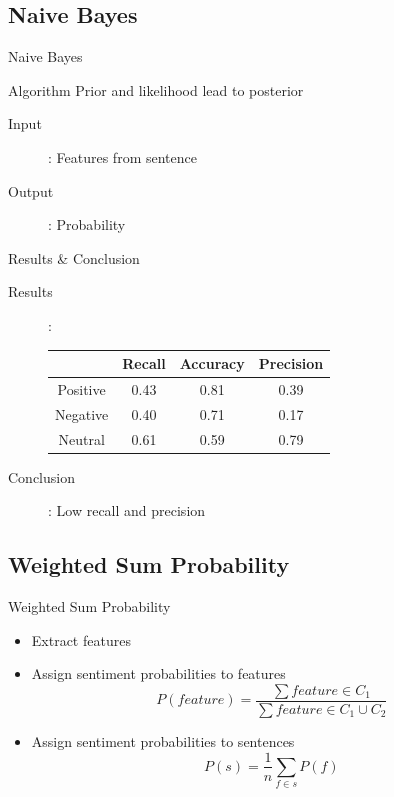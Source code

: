 \documentclass{beamer}
\begin{document}
\subsection{Naive Bayes}
\begin{frame}{Naive Bayes}
\begin{block}{Algorithm}
Prior and likelihood lead to posterior
\end{block}
\begin{description}
\item[Input]: Features from sentence
\item[Output]: Probability
\end{description}
\end{frame}
\begin{frame}{Results \& Conclusion}
\begin{description}
\item[Results]:
\begin{tabular}{c || c | c | c}\\
 & Recall & Accuracy & Precision \\
\hline
Positive & 0.43 & 0.81 & 0.39\\
Negative & 0.40 & 0.71 & 0.17 \\
Neutral & 0.61 & 0.59 & 0.79 \\
\end{tabular}
\item[Conclusion]: Low recall and precision
\end{description}
\end{frame}

\subsection{Weighted Sum Probability}
\begin{frame}{Weighted Sum Probability}
\begin{itemize}
\item Extract features
\item Assign sentiment probabilities to features
\begin{equation}
P(feature) = \frac{ \sum feature \in C_1}{\sum feature \in C_1\cup C_2}
\end{equation}
\item Assign sentiment probabilities to sentences
\begin{equation}
P(s) = \frac{1}{n} \sum_{f \in s} P(f)
\end{equation}
\end{itemize}
\end{frame}
\end{document}
